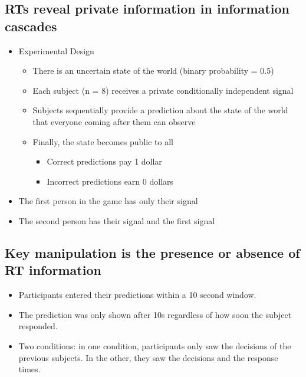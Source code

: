 \subsection{RTs reveal private information in information cascades}
\begin{itemize}
    \item Experimental Design
    \begin{itemize}
        \item There is an uncertain state of the world (binary probability = 0.5)
        \item Each subject (n = 8) receives a private conditionally independent signal
        \item Subjects sequentially provide a prediction about the state of the world that everyone coming after them can observe
        \item Finally, the state becomes public to all
        \begin{itemize}
            \item Correct predictions pay 1 dollar
            \item Incorrect predictions earn 0 dollars
        \end{itemize}
    \end{itemize}
    \item The first person in the game has only their signal
    \item The second person has their signal and the first signal
\end{itemize}

\subsection{Key manipulation is the presence or absence of RT information}
\begin{itemize}
    \item Participants entered their predictions within a 10 second window.
    \item The prediction was only shown after 10s regardless of how soon the subject responded.
    \item Two conditions: in one condition, participants only saw the decisions of the previous subjects. In the other, they saw the decisions and the response times.
\end{itemize}


